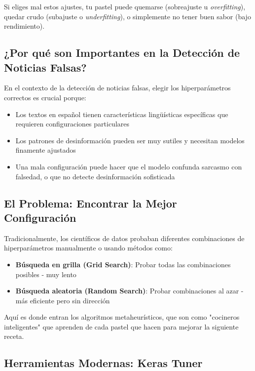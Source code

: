 Si eliges mal estos ajustes, tu pastel puede quemarse (sobreajuste u \textit{overfitting}), quedar crudo (subajuste o \textit{underfitting}), o simplemente no tener buen sabor (bajo rendimiento).

\subsection{¿Por qué son Importantes en la Detección de Noticias Falsas?}

En el contexto de la detección de noticias falsas, elegir los hiperparámetros correctos es crucial porque:

\begin{itemize}
    \item Los textos en español tienen características lingüísticas específicas que requieren configuraciones particulares
    \item Los patrones de desinformación pueden ser muy sutiles y necesitan modelos finamente ajustados
    \item Una mala configuración puede hacer que el modelo confunda sarcasmo con falsedad, o que no detecte desinformación sofisticada
\end{itemize}

\subsection{El Problema: Encontrar la Mejor Configuración}

Tradicionalmente, los científicos de datos probaban diferentes combinaciones de hiperparámetros manualmente o usando métodos como:

\begin{itemize}
    \item \textbf{Búsqueda en grilla (Grid Search)}: Probar todas las combinaciones posibles - muy lento
    \item \textbf{Búsqueda aleatoria (Random Search)}: Probar combinaciones al azar - más eficiente pero sin dirección
\end{itemize}

Aquí es donde entran los algoritmos metaheurísticos, que son como "cocineros inteligentes" que aprenden de cada pastel que hacen para mejorar la siguiente receta.

\subsection{Herramientas Modernas: Keras Tuner}

